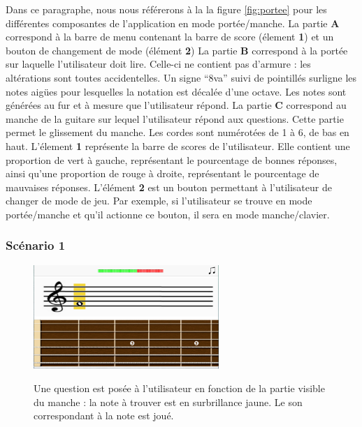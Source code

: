\documentclass{scrreprt}
\begin{document}
Dans ce paragraphe, nous nous référerons à la la figure \ref{fig:portee} pour les différentes composantes de l’application en mode portée/manche.\newline
La partie \textbf{A} correspond à la barre de menu contenant la barre de score (élement \textbf{1}) et un bouton de changement de mode (élément 
\textbf{2})\newline
La partie \textbf{B} correspond à la portée sur laquelle l'utilisateur doit lire. Celle-ci ne contient pas d'armure : les altérations sont toutes 
accidentelles. Un signe \enquote{8va} suivi de pointillés surligne les notes aigües pour lesquelles la notation est décalée d'une octave. Les notes sont générées 
au fur et à mesure que l'utilisateur répond.\newline
La partie \textbf{C} correspond au manche de la guitare sur lequel l'utilisateur répond aux questions. Cette partie permet le glissement du manche. Les cordes sont numérotées de 1 à 6, de bas en haut.\newline
L'élement \textbf{1} représente la barre de scores de l'utilisateur. Elle contient une proportion de vert à gauche, représentant le pourcentage de bonnes 
réponses, 
ainsi qu'une proportion de rouge à droite, représentant le pourcentage de mauvaises réponses.\newline
L'élément \textbf{2} est un bouton permettant à l'utilisateur de changer de mode de jeu. Par exemple, si l'utilisateur se trouve en mode portée/manche et 
qu'il actionne ce bouton, il sera en mode manche/clavier.

\newpage



\subsubsection{Scénario 1}

\bigbreak
\begin{figure}[!ht]
  \begin{minipage}{0.55\linewidth}
    \includegraphics[width=7cm]{images/maquette_usecase/portee/question_une_note_1.png}
  \end{minipage}\hfill
  \begin{minipage}{0.5\linewidth}
  {Une question est posée à l'utilisateur en fonction de la partie visible du manche : la note à trouver est en surbrillance jaune. 
  Le son correspondant à la note est joué.}
   \end{minipage}
\end{figure}
\end{document}
